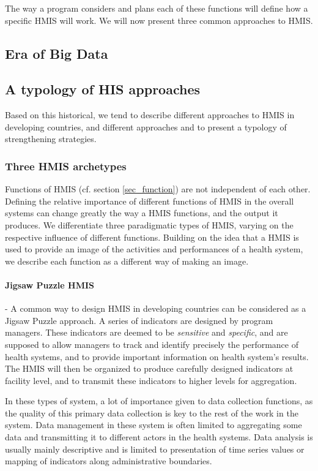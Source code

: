 The way a program considers and plans each of these functions will define how a specific HMIS will work. We will now present three common approaches to HMIS.



\subsection{Era of Big Data}


\subsection{A typology of HIS approaches}

Based on this historical, we tend to describe different approaches to HMIS in developing countries, and different approaches and to present a typology of strengthening strategies.

\subsubsection{Three HMIS archetypes}

Functions of HMIS (cf. section \ref{sec_function}) are not independent of each other. Defining the relative importance of different functions of HMIS in the overall systems can change greatly the way a HMIS functions, and the output it produces. We differentiate three paradigmatic types of HMIS, varying on the respective influence of different functions. Building on the idea that a HMIS is used to provide an image of the activities and performances of a health system, we describe each function as a different way of making an image.

\paragraph{Jigsaw Puzzle HMIS} - A common way to design HMIS in developing countries can be considered as a Jigsaw Puzzle approach. A series of indicators are designed by program managers. These indicators are deemed to be \textit{sensitive} and \textit{specific}, and are supposed to allow managers to track and identify precisely the performance of health systems, and to provide important information on health system's results. The HMIS will then be organized to produce carefully designed indicators at facility level, and to transmit these indicators to higher levels for aggregation.

In these types of system, a lot of importance given to data collection functions, as the quality of this primary data collection is key to the rest of the work in the system. Data management in these system is often limited to aggregating some data and transmitting it to different actors in the health systems. Data analysis is usually mainly descriptive and is limited to presentation of time series values or mapping of indicators along administrative boundaries.

